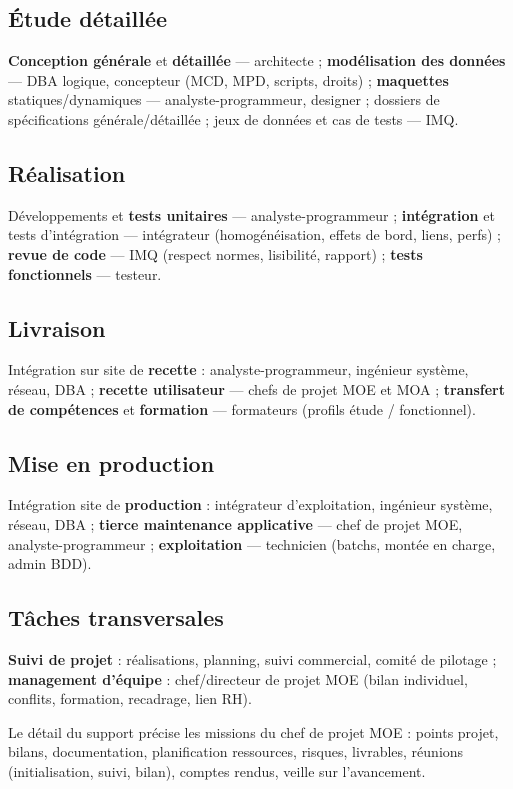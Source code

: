 \documentclass[11pt,a4paper]{article}
\begin{document}
\subsection{Étude détaillée}
\textbf{Conception générale} et \textbf{détaillée} — architecte ; \textbf{modélisation des données} — DBA logique, concepteur (MCD, MPD, scripts, droits) ; \textbf{maquettes} statiques/dynamiques — analyste-programmeur, designer ; dossiers de spécifications générale/détaillée ; jeux de données et cas de tests — IMQ.

\subsection{Réalisation}
Développements et \textbf{tests unitaires} — analyste-programmeur ; \textbf{intégration} et tests d'intégration — intégrateur (homogénéisation, effets de bord, liens, perfs) ; \textbf{revue de code} — IMQ (respect normes, lisibilité, rapport) ; \textbf{tests fonctionnels} — testeur.

\subsection{Livraison}
Intégration sur site de \textbf{recette} : analyste-programmeur, ingénieur système, réseau, DBA ; \textbf{recette utilisateur} — chefs de projet MOE et MOA ; \textbf{transfert de compétences} et \textbf{formation} — formateurs (profils étude / fonctionnel).

\subsection{Mise en production}
Intégration site de \textbf{production} : intégrateur d'exploitation, ingénieur système, réseau, DBA ; \textbf{tierce maintenance applicative} — chef de projet MOE, analyste-programmeur ; \textbf{exploitation} — technicien (batchs, montée en charge, admin BDD).

\subsection{Tâches transversales}
\textbf{Suivi de projet} : réalisations, planning, suivi commercial, comité de pilotage ; \textbf{management d'équipe} : chef/directeur de projet MOE (bilan individuel, conflits, formation, recadrage, lien RH).

Le détail du support précise les missions du chef de projet MOE : points projet, bilans, documentation, planification ressources, risques, livrables, réunions (initialisation, suivi, bilan), comptes rendus, veille sur l'avancement.
\end{document}
